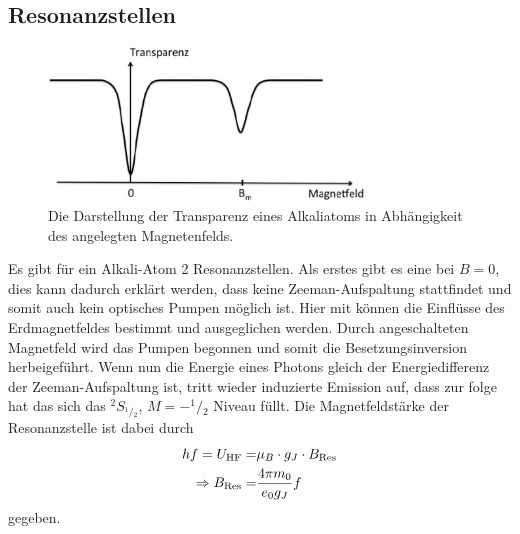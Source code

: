 \subsection{Resonanzstellen}
\begin{figure}[h!]
	\centering
	\includegraphics[width = 0.75\textwidth]{../Grafiken/Resonanz.pdf}
	\caption{Die Darstellung der Transparenz eines Alkaliatoms in Abhängigkeit des angelegten Magnetenfelds.\cite{V21}}\label{fit:Resonanz}
\end{figure}
Es gibt für ein Alkali-Atom 2 Resonanzstellen.
Als erstes gibt es eine bei $B=0$, dies kann dadurch erklärt werden, dass keine Zeeman-Aufspaltung stattfindet und somit auch kein optisches Pumpen möglich ist.
Hier mit können die Einflüsse des Erdmagnetfeldes bestimmt und ausgeglichen werden.
Durch angeschalteten Magnetfeld wird das Pumpen begonnen und somit die Besetzungsinversion herbeigeführt.
Wenn nun die Energie eines Photons gleich der Energiedifferenz der Zeeman-Aufspaltung ist, tritt wieder induzierte Emission auf, dass zur folge hat das sich das ${}^2S_{{}^1\!/\!_2}$, $M=-^1\!/\!_2$ Niveau füllt.
Die Magnetfeldstärke der Resonanzstelle ist dabei durch
\begin{align}
	\notag
	hf = U_\text{HF} =& \mu_B\cdot g_J\cdot B_\text{Res}\\
	\Rightarrow B_\text{Res}=&\frac{4\pi m_0}{e_0g_J}f
	\label{eq:gerade_magnetfeld_frequenz}
\end{align}
gegeben.
\newpage

